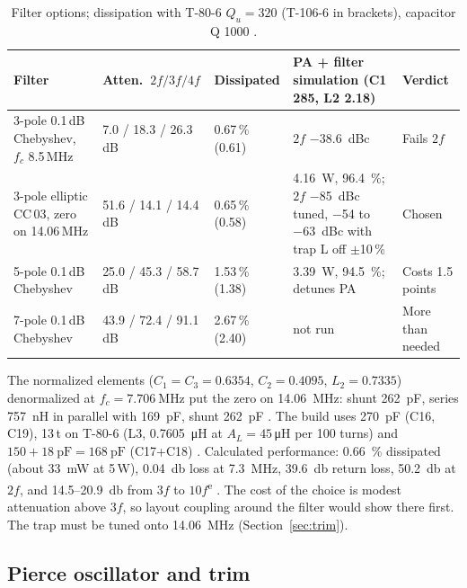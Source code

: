 \documentclass[11pt,letterpaper]{article}
\newcommand{\est}{\textsuperscript{e}}
\begin{document}
\begin{table}[h]
\centering\small
\caption{Filter options; dissipation with T-80-6 $Q_u=320$ (T-106-6 in brackets), capacitor Q 1000 \cite{projnotes,emrfd,zverev1967}.}\label{tab:lpfopts}
\begin{tabularx}{\textwidth}{@{}L{3.3cm}L{2.5cm}L{1.9cm}YL{2.2cm}@{}}
\toprule
Filter & Atten.\ $2f/3f/4f$ & Dissipated & PA + filter simulation (C1 285, L2 2.18) & Verdict \\ -pole 0.1\,dB Chebyshev, $f_c$ 8.5\,MHz \cite[Table 3.1, p.~3.5]{emrfd} & 7.0 / 18.3 / 26.3\,dB & 0.67\,\% (0.61) & $2f$ \SI{-38.6}{dBc} & Fails $2f$ \\
3-pole elliptic CC\,03, zero on 14.06\,MHz \cite[p.~175]{zverev1967} & 51.6 / 14.1 / 14.4\,dB & 0.65\,\% (0.58) & \SI{4.16}{\watt}, \SI{96.4}{\percent}; $2f$ \SI{-85}{dBc} tuned, \SI{-54}{} to \SI{-63}{dBc} with trap L off $\pm$10\,\% & Chosen \\
5-pole 0.1\,dB Chebyshev \cite[Table 3.1]{emrfd} & 25.0 / 45.3 / 58.7\,dB & 1.53\,\% (1.38) & \SI{3.39}{\watt}, \SI{94.5}{\percent}; detunes PA & Costs 1.5 points \\
7-pole 0.1\,dB Chebyshev & 43.9 / 72.4 / 91.1\,dB & 2.67\,\% (2.40) & not run & More than needed \\
\bottomrule
\end{tabularx}
\end{table}

The normalized elements ($C_1=C_3=0.6354$, $C_2=0.4095$, $L_2=0.7335$) denormalized at $f_c=\SI{7.706}{\mega\hertz}$ put the zero on \SI{14.06}{\mega\hertz}: shunt \SI{262}{\pico\farad}, series \SI{757}{\nano\henry} in parallel with \SI{169}{\pico\farad}, shunt \SI{262}{\pico\farad} \cite{projnotes,zverev1967}. The build uses \SI{270}{\pico\farad} (C16, C19), 13\,t on T-80-6 (L3, \SI{0.7605}{\micro\henry} at $A_L=45$\,\si{\micro\henry} per 100 turns) and $150+\SI{18}{\pico\farad}=\SI{168}{\pico\farad}$ (C17+C18) \cite{projkicad}. Calculated performance: \SI{0.66}{\percent} dissipated (about \SI{33}{\milli\watt} at 5\,W), \SI{0.04}{\decibel} loss at \SI{7.3}{\mega\hertz}, \SI{39.6}{\decibel} return loss, \SI{50.2}{\decibel} at $2f$, and 14.5--\SI{20.9}{\decibel} from $3f$ to $10f$\est{} \cite{projnotes}. The cost of the choice is modest attenuation above $3f$, so layout coupling around the filter would show there first. The trap must be tuned onto \SI{14.06}{\mega\hertz} (Section~\ref{sec:trim}).

\subsection{Pierce oscillator and trim}\label{sec:osc}
\end{document}
